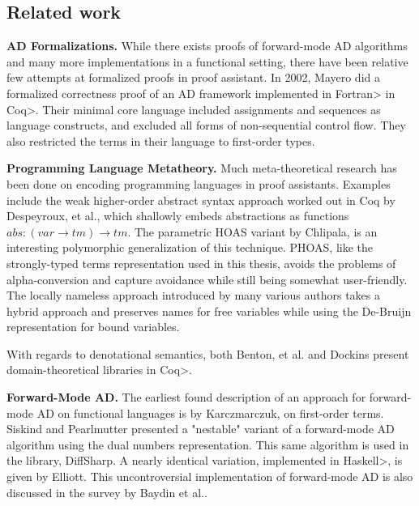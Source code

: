 \subsection{Related work}\label{sec:related-work}
\textbf{AD Formalizations.} While there exists proofs of forward-mode AD algorithms\cite{huot2020correctness}\cite{barthe2020versatility}\cite{10.1145/3371106} and many more implementations\cite{Shaikha2019}\cite{Margossian2019ARO} in a functional setting, there have been relative few attempts at formalized proofs in proof assistant.
In 2002, Mayero did a formalized correctness proof of an AD framework implemented in \<Fortran> in \<Coq>\cite{Mayero:CorrectnessProofAD}.
Their minimal core language included assignments and sequences as language constructs, and excluded all forms of non-sequential control flow.
They also restricted the terms in their language to first-order types.

\textbf{Programming Language Metatheory.} Much meta-theoretical research has been done on encoding programming languages in proof assistants\cite{Aydemir2005}.
Examples include the weak higher-order abstract syntax approach worked out in Coq by Despeyroux, et al.\cite{10.1007/BFb0014049}, which shallowly embeds abstractions as functions $abs : (var \to tm) \to tm$.
The parametric HOAS variant by Chlipala\cite{10.1145/1411204.1411226}, is an interesting polymorphic generalization of this technique.
PHOAS, like the strongly-typed terms representation used in this thesis, avoids the problems of alpha-conversion and capture avoidance while still being somewhat user-friendly.
The locally nameless approach introduced by many various authors\cite{McKinna_Pollack_1997}\cite{10.1007/3-540-57826-9_152}\cite{10.1145/1017472.1017477} takes a hybrid approach and preserves names for free variables while using the De-Bruijn representation for bound variables.

With regards to denotational semantics, both Benton, et al.\cite{Benton2009} and Dockins\cite{Dockins2014} present domain-theoretical libraries in \<Coq>.

\textbf{Forward-Mode AD.}
The earliest found description of an approach for forward-mode AD on functional languages is by Karczmarczuk\cite{Karczmarczuk98functionaldifferentiation}, on first-order terms.
Siskind and Pearlmutter presented a "nestable" variant of a forward-mode AD algorithm using the dual numbers representation.
This same algorithm is used in the \FS{} library, DiffSharp\cite{Baydin2015AutomaticDI}.
A nearly identical variation, implemented in \<Haskell>, is given by Elliott\cite{Elliott2009-beautiful-differentiation}.
This uncontroversial implementation of forward-mode AD is also discussed in the survey by Baydin et al.\cite{Baydin2015AutomaticDI}.

